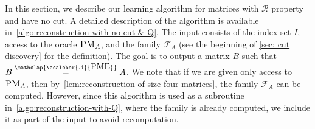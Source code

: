 \documentclass[11pt,letterpaper]{article}
\newcommand{\F}{\mathbb{F}}
\newcommand{\PME}{\stackrel{\mathclap{\scalebox{.4}{\mbox{PME}}}}{=}}
\newcommand{\prop}{\mathcal{R}}
\newcommand{\PMoracle}[1]{\textsc{PM}_{#1}}
\newcommand{\submatrixfamily}[1]{\mathcal{F}_{#1}}
\begin{document}
{{{In this section, we describe our learning algorithm for matrices with $\prop$ property and have no cut. A detailed description of the algorithm is available in~\cref{algo:reconstruction-with-no-cut-&-Q}. The input consists of the index set $I$, access to the oracle $\PMoracle{A}$, and the family $\submatrixfamily{A}$ (see the beginning of \cref{sec: cut discovery} for the definition). The goal is to output a matrix $B$ such that $B\PME A$. We note that if we are given only access to $\PMoracle{A}$, then by~\cref{lem:reconstruction-of-size-four-matrices}, the family $\submatrixfamily{A}$ can be computed. However, since this algorithm is used as a subroutine in~\cref{algo:reconstruction-with-Q}, where the family is already computed, we include it as part of the input to avoid recomputation. 




}}}
\end{document}
